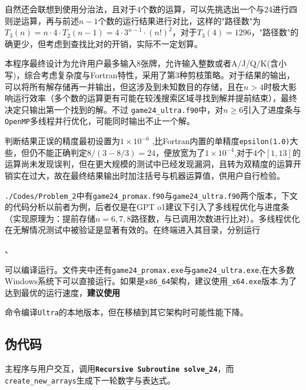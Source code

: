 自然还会联想到使用分治法，且对于4个数的运算，可以先挑选出一个与24进行四则逆运算，再与前述$n-1$个数的运行结果进行对比，这样的"路径数"为$T_3(n) = n \cdot 4 \cdot T_{2}(n-1) = 4 \cdot 3^{n-1} \cdot (n!)^2$，对于$T_3(4)=1296$，"路径数"的确更少，但考虑到查找比对的开销，实际不一定划算。

本程序最终设计为允许用户最多输入$8$张牌，允许输入整数或者A/J/Q/K(含小写)，综合考虑复杂度与Fortran特性，采用了第3种剪枝策略。对于结果的输出，可以将所有解存储再一并输出，但这涉及到未知数目的存储，且在$n>4$时极大影响运行效率（多个数的运算更有可能在较浅搜索区域寻找到解并提前结束），最终决定只输出第一个找到的解。不过 \texttt{game24\_ultra.f90}中，对$n\ge 6 $引入了进度条与\texttt{OpenMP}多线程并行优化，可能同时输出不止一个解。

判断结果正误的精度最初设置为$1 \times 10^{-6}$
,比Fortran内置的单精度\texttt{epsilon(1.0)}大些，但仍不能正确判定$8/(3-8/3) = 24$，便放宽为了$1 \times 10^{-4}$,对于4个$[1,13]$的运算尚未发现误判，但在更大规模的测试中已经发现漏洞，且转为双精度的运算开销实在过大，故在最终结果输出时加注括号与机器运算值，供用户自行检验。

\texttt{./Codes/Problem\_2}中有\texttt{game24\_promax.f90}与\texttt{game24\_ultra.f90}两个版本，下文的代码分析以前者为例，后者仅是在GPT o1建议下引入了多线程优化与进度条（实现原理为：提前存储$n=6,7,8$路径数，与已调用次数进行比对）。多线程优化在无解情况测试中被验证是显著有效的。在终端进入其目录，分别运行

\noindent {}、


\noindent 可以编译运行。文件夹中还有\texttt{game24\_promax.exe}与\texttt{game24\_ultra.exe},在大多数Windows系统下可以直接运行。如果是\texttt{x86\_64}架构，建议使用\texttt{\_x64.exe}版本.为了达到最优的运行速度，\textbf{建议使用}

\noindent {} 命令编译\texttt{Ultra}的本地版本，但在移植到其它架构时可能性能下降。

\subsection{伪代码}
\noindent 主程序与用户交互，调用\texttt{\textbf{Recursive Subroutine solve\_24}}，而\texttt{ create\_new\_arrays}生成下一轮数字与表达式。

